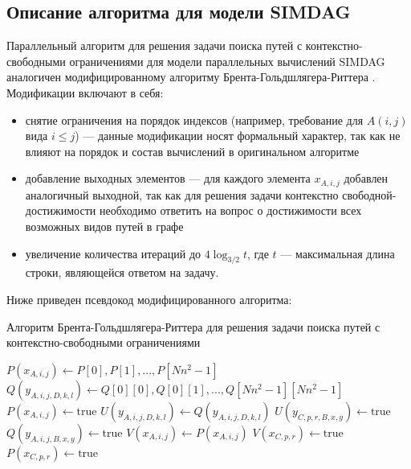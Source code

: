 \documentclass{spbau-diploma}
\begin{document}
\subsection {Описание алгоритма для модели SIMDAG}
Параллельный алгоритм для решения задачи поиска путей с контекстно-свободными ограничениями для модели параллельных вычислений SIMDAG аналогичен модифицированному алгоритму Брента-Гольдшлягера-Риттера \cite{Brent}. Модификации включают в себя:
\begin{itemize} 
  \item снятие ограничения на порядок индексов (например, требование для $A(i, j)$ вида $i \leq j$) --- данные модификации носят формальный характер, так как не влияют на порядок и состав вычислений в оригинальном алгоритме
  \item добавление выходных элементов --- для каждого элемента $x_{A, i, j}$ добавлен аналогичный выходной, так как для решения задачи контекстно свободной-достижимости необходимо ответить на вопрос о достижимости всех возможных видов путей в графе
\item увеличение количества итераций до $4\log_{3/2}t$, где $t$ --- максимальная длина строки, являющейся ответом на задачу.
\end{itemize}
Ниже приведен псевдокод модифицированного алгоритма:
\begin{algorithm}
\caption{Алгоритм Брента-Гольдшлягера-Риттера для решения задачи поиска путей с контекстно-свободными ограничениями}\label{euclid}
\begin{algorithmic}[1]
\State $\textit{$P(x_{A, i, j})$} \gets \textit{$P[0], P[1], ... , P[Nn^2 - 1]$}$
\State $\textit{$Q(y_{A,i,j,D,k,l})$} \gets \textit{$Q[0][0], Q[0][1], ... , Q[Nn^2 - 1] [Nn^2 - 1]$}$
\State $P(x_{A, i, j})  \gets \text{true}$
\EndIf
{}
\State  $\textit{$U(y_{A,i,j,D,k,l})$} \gets \textit{$Q(y_{A,i,j,D,k,l})$}$
\State $U(y_{C,p,r,B,x,y}) \gets \text{true}$
\EndIf
{}
\State $Q(y_{A,i,j,B,x,y}) \gets \text{true}$
\EndIf
\State $V(x_{A, i, j})  \gets P(x_{A, i, j})$
\State $V(x_{C, p, r}) \gets \text{true}$
\EndIf
{}
\State $P(x_{C, p, r}) \gets \text{true}$
\EndIf
 \EndFor
\end{algorithmic}
\end{algorithm}
\end{document}
